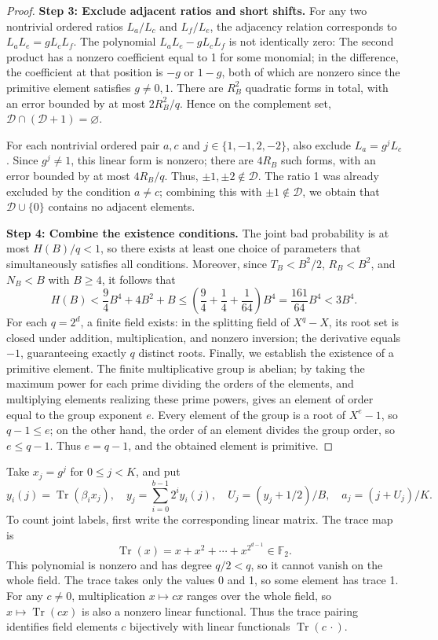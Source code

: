 \documentclass[a4paper,11pt]{article}
\theoremstyle{remark}
\begin{document}
\begin{proof}
\textbf{Step 3: Exclude adjacent ratios and short shifts.}
For any two nontrivial ordered ratios $L_a/L_c$ and $L_f/L_e$, the adjacency relation corresponds to
$L_a L_e = g L_c L_f$. The polynomial $L_a L_e - g L_c L_f$ is not identically zero:
The second product has a nonzero coefficient equal to 1 for some monomial; in the difference, the coefficient at that position is
$-g$ or $1-g$, both of which are nonzero since the primitive element satisfies $g \neq 0, 1$.
There are $R_B^2$ quadratic forms in total, with an error bounded by at most $2 R_B^2 / q$.
Hence on the complement set, $\mathcal D \cap (\mathcal D + 1) = \varnothing$.

For each nontrivial ordered pair $a,c$ and $j\in\{1,-1,2,-2\}$, also exclude
$L_a = g^j L_c$. Since $g^j \neq 1$, this linear form is nonzero; there are $4 R_B$ such forms,
with an error bounded by at most $4 R_B / q$. Thus, $\pm 1, \pm 2 \notin \mathcal D$.
The ratio 1 was already excluded by the condition $a \neq c$; combining this with $\pm 1 \notin \mathcal D$,
we obtain that $\mathcal D \cup \{0\}$ contains no adjacent elements.

\textbf{Step 4: Combine the existence conditions.}
The joint bad probability is at most $H(B)/q < 1$, so there exists at least one choice of parameters that simultaneously satisfies all conditions.
Moreover, since $T_B < B^2/2$, $R_B < B^2$, and $N_B < B$ with $B \geq 4$, it follows that
\[
 H(B)<\frac94B^4+4B^2+B
 \le\left(\frac94+\frac14+\frac1{64}\right)B^4
 =\frac{161}{64}B^4<3B^4.
\]
For each $q = 2^d$, a finite field exists: in the splitting field of $X^q - X$, its root set is closed under addition, multiplication,
and nonzero inversion; the derivative equals $-1$, guaranteeing exactly $q$ distinct roots.
Finally, we establish the existence of a primitive element. The finite multiplicative group is abelian; by taking the maximum power for each prime
dividing the orders of the elements, and multiplying elements realizing these prime powers, gives an element of order equal to the group exponent $e$.
Every element of the group is a root of $X^e-1$, so $q-1 \le e$; on the other hand, the order of an element divides
the group order, so $e\le q-1$. Thus $e=q-1$, and the obtained element is primitive.
\end{proof}

Take $x_j=g^j$ for $0\le j<K$, and put
\[
 y_i(j)=\operatorname{Tr}(\beta_ix_j),\quad
 y_j=\sum_{i=0}^{b-1}2^iy_i(j),\quad
 U_j=(y_j+1/2)/B,\quad a_j=(j+U_j)/K.
\]
To count joint labels, first write the corresponding linear matrix.
The trace map is
\[
 \operatorname{Tr}(x)=x+x^2+\cdots+x^{2^{d-1}}\in\mathbb F_2.
\]
This polynomial is nonzero and has degree $q/2<q$, so it cannot vanish on the whole field.
The trace takes only the values 0 and 1, so some element has trace 1. For any $c\ne0$, multiplication $x\mapsto cx$
ranges over the whole field, so $x\mapsto\operatorname{Tr}(cx)$ is also a nonzero linear functional.
Thus the trace pairing identifies field elements $c$ bijectively with linear functionals $\operatorname{Tr}(c\,\cdot)$.
\end{document}
